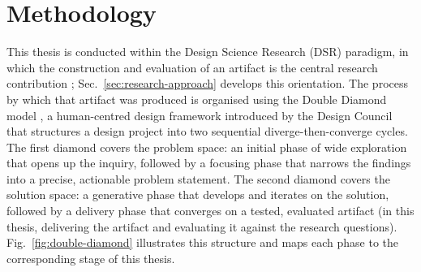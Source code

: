 \chapter{Methodology}
\label{ch:methodology}

This thesis is conducted within the Design Science Research (DSR) paradigm, in which the construction and evaluation of an artifact is the central research contribution \cite{hevner2004designscience, peffers2007dsrm}; Sec.~\ref{sec:research-approach} develops this orientation.
The process by which that artifact was produced is organised using the Double Diamond model \cite{designcouncil2023diamond}, a human-centred design framework introduced by the Design Council that structures a design project into two sequential diverge-then-converge cycles.
The first diamond covers the problem space: an initial phase of wide exploration that opens up the inquiry, followed by a focusing phase that narrows the findings into a precise, actionable problem statement.
The second diamond covers the solution space: a generative phase that develops and iterates on the solution, followed by a delivery phase that converges on a tested, evaluated artifact (in this thesis, delivering the artifact and evaluating it against the research questions).
Fig.~\ref{fig:double-diamond} illustrates this structure and maps each phase to the corresponding stage of this thesis.

